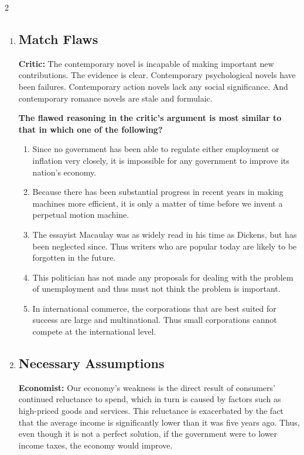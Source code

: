\documentclass[9pt]{article}
\begin{document}
\begin{multicols}{2}
\begin{enumerate}
\item
\subsection*{Match Flaws}

\noindent
\textbf{Critic:} The contemporary novel is incapable of making important new contributions. The evidence is clear. Contemporary psychological novels have been failures. Contemporary action novels lack any social significance. And contemporary romance novels are stale and formulaic.

 

\noindent
\textbf{The flawed reasoning in the critic's argument is most similar to that in which one of the following?}

\begin{enumerate}[label=(\alph*)]
    \item Since no government has been able to regulate either employment or inflation very closely, it is impossible for any government to improve its nation's economy.
    \item Because there has been substantial progress in recent years in making machines more efficient, it is only a matter of time before we invent a perpetual motion machine.
    \item The essayist Macaulay was as widely read in his time as Dickens, but has been neglected since. Thus writers who are popular today are likely to be forgotten in the future.
    \item This politician has not made any proposals for dealing with the problem of unemployment and thus must not think the problem is important.
    \item In international commerce, the corporations that are best suited for success are large and multinational. Thus small corporations cannot compete at the international level.
\end{enumerate}


\item 
\subsection*{Necessary Assumptions}

\noindent
\textbf{Economist:} Our economy's weakness is the direct result of consumers' continued reluctance to spend, which in turn is caused by factors such as high-priced goods and services. This reluctance is exacerbated by the fact that the average income is significantly lower than it was five years ago. Thus, even though it is not a perfect solution, if the government were to lower income taxes, the economy would improve.


\end{enumerate}
\end{multicols}
\end{document}
